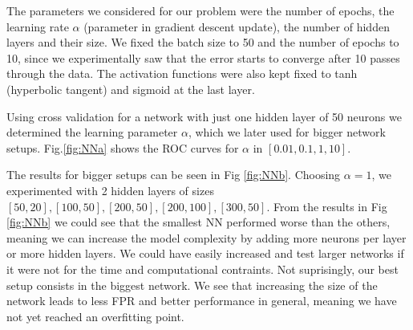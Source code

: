 The parameters we considered for our problem were the number of epochs, the learning rate $\alpha$ (parameter in gradient descent update), the number of hidden layers and their size. We fixed the batch size to 50 and the number of epochs to 10, since we experimentally saw that the error starts to converge after 10 passes through the data. The activation functions were also kept fixed to tanh (hyperbolic tangent) and sigmoid at the last layer. 

Using cross validation for a network with just one hidden layer of 50 neurons we determined the learning parameter $\alpha$, which we later used for bigger network setups. Fig.\ref{fig:NNa}  shows the ROC curves for $\alpha$ in  $[0.01,0.1,1,10]$.

The results for bigger setups can be seen in Fig \ref{fig:NNb}. Choosing $\alpha=1$, we experimented with 2 hidden layers of sizes $[50,20],[100,50],[200,50],[200,100],[300,50]$. From the results in Fig \ref{fig:NNb} we could see that the smallest NN performed worse than the others, meaning we  can increase the model complexity by adding more neurons per layer or more hidden layers.  We could have easily increased and test larger networks if it were not for the time and computational contraints. Not suprisingly, our best setup consists in the biggest network. We see that increasing the size of the network leads to less FPR and better performance in general, meaning we have not yet reached an overfitting point.

